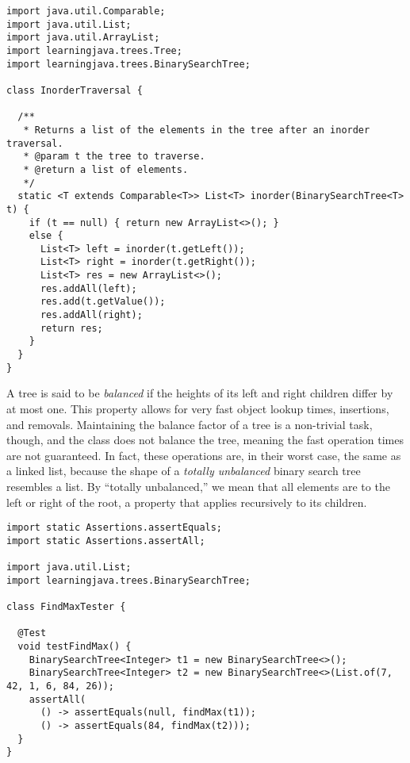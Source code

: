 \newpage
\begin{lstlisting}[language=MyJava]
import java.util.Comparable;
import java.util.List;
import java.util.ArrayList;
import learningjava.trees.Tree;
import learningjava.trees.BinarySearchTree;

class InorderTraversal {

  /**
   * Returns a list of the elements in the tree after an inorder traversal.
   * @param t the tree to traverse.
   * @return a list of elements.
   */
  static <T extends Comparable<T>> List<T> inorder(BinarySearchTree<T> t) {
    if (t == null) { return new ArrayList<>(); } 
    else {
      List<T> left = inorder(t.getLeft());
      List<T> right = inorder(t.getRight());
      List<T> res = new ArrayList<>();
      res.addAll(left);
      res.add(t.getValue());
      res.addAll(right);
      return res;
    }
  }
}
\end{lstlisting}

A tree is said to be \emph{balanced} if the heights of its left and right children differ by at most one.
This property allows for very fast object lookup times, insertions, and removals. 
Maintaining the balance factor of a tree is a non-trivial task, though, and the  class does not balance the tree, meaning the fast operation times are not guaranteed.
In fact, these operations are, in their worst case, the same as a linked list, because the shape of a \emph{totally unbalanced} binary search tree resembles a list. 
By ``totally unbalanced,'' we mean that all elements are to the left or right of the root, a property that applies recursively to its children.


\begin{lstlisting}[language=MyJava]
import static Assertions.assertEquals;
import static Assertions.assertAll;

import java.util.List;
import learningjava.trees.BinarySearchTree;

class FindMaxTester {

  @Test
  void testFindMax() {
    BinarySearchTree<Integer> t1 = new BinarySearchTree<>();
    BinarySearchTree<Integer> t2 = new BinarySearchTree<>(List.of(7, 42, 1, 6, 84, 26));
    assertAll(
      () -> assertEquals(null, findMax(t1));
      () -> assertEquals(84, findMax(t2)));
  }
}
\end{lstlisting}

